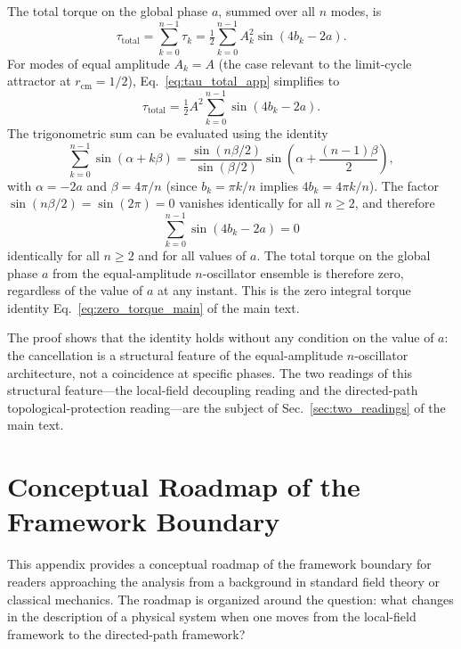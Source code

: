 \documentclass[%
 reprint, amsmath,amssymb, aps, prb, ]{revtex4-2}
\numberwithin{equation}{section}
\begin{document}
The total torque on the global phase $a$, summed over all $n$ modes, is
\begin{equation}
\tau_{\mathrm{total}} = \sum_{k=0}^{n-1} \tau_k = \tfrac{1}{2} \sum_{k=0}^{n-1} A_k^2 \sin(4 b_k - 2 a).
\label{eq:tau_total_app}
\end{equation}
For modes of equal amplitude $A_k = A$ (the case relevant to the limit-cycle attractor at $r_{\mathrm{cm}} = 1/2$), Eq.~\eqref{eq:tau_total_app} simplifies to
\begin{equation}
\tau_{\mathrm{total}} = \tfrac{1}{2} A^2 \sum_{k=0}^{n-1} \sin(4 b_k - 2 a).
\label{eq:tau_equal_amp}
\end{equation}
The trigonometric sum can be evaluated using the identity
\begin{equation}
\sum_{k=0}^{n-1} \sin(\alpha + k \beta) = \frac{\sin(n\beta/2)}{\sin(\beta/2)} \sin\!\left(\alpha + \frac{(n-1)\beta}{2}\right),
\label{eq:sin_sum}
\end{equation}
with $\alpha = -2a$ and $\beta = 4\pi/n$ (since $b_k = \pi k/n$ implies $4 b_k = 4\pi k/n$). The factor $\sin(n\beta/2) = \sin(2\pi) = 0$ vanishes identically for all $n \geq 2$, and therefore
\begin{equation}
\sum_{k=0}^{n-1} \sin(4 b_k - 2 a) = 0
\label{eq:zero_torque_app}
\end{equation}
identically for all $n \geq 2$ and for all values of $a$. The total torque on the global phase $a$ from the equal-amplitude $n$-oscillator ensemble is therefore zero, regardless of the value of $a$ at any instant. This is the zero integral torque identity Eq.~\eqref{eq:zero_torque_main} of the main text.

The proof shows that the identity holds without any condition on the value of $a$: the cancellation is a structural feature of the equal-amplitude $n$-oscillator architecture, not a coincidence at specific phases. The two readings of this structural feature---the local-field decoupling reading and the directed-path topological-protection reading---are the subject of Sec.~\ref{sec:two_readings} of the main text.


\section{Conceptual Roadmap of the Framework Boundary}
\label{app:roadmap}

This appendix provides a conceptual roadmap of the framework boundary for readers approaching the analysis from a background in standard field theory or classical mechanics. The roadmap is organized around the question: what changes in the description of a physical system when one moves from the local-field framework to the directed-path framework?
\end{document}
